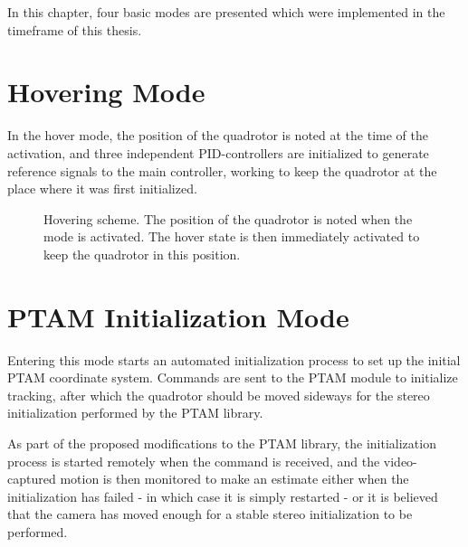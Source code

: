         In this chapter, four basic modes are presented which were implemented
        in the timeframe of this thesis.

    \section{Hovering Mode}
        In the hover mode, the position of the quadrotor is noted at
        the time of the activation, and three independent PID-controllers
        are initialized to generate reference signals to the main controller,
        working to keep the quadrotor at the place where it was first initialized.
        \begin{figure}[H]
            \noindent{}
            \caption{Hovering scheme. The position of the quadrotor is noted when the mode is activated. The hover state is then immediately activated to keep the quadrotor in this position.}
            \label{fig:logic:hoverscheme}
        \end{figure}

    \section{PTAM Initialization Mode}
        Entering this mode starts an automated initialization process
        to set up the initial PTAM coordinate system. Commands are sent
        to the PTAM module to initialize tracking, after which
        the quadrotor should be moved sideways for the
        stereo initialization performed by the PTAM library.

        As part of the proposed modifications to the PTAM library, the
        initialization process is started remotely when the command is received,
        and the video-captured motion is then monitored to make an estimate either
        when the initialization has failed - in which case it is simply restarted -
        or it is believed that the camera has moved enough for a stable
        stereo initialization to be performed.

